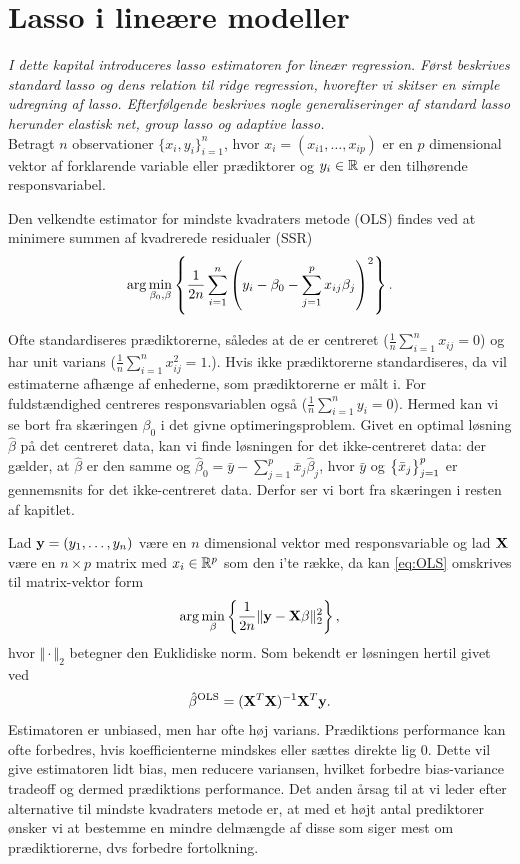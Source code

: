 \chapter{Lasso i lineære modeller}
\textit{I dette kapital introduceres lasso estimatoren for lineær regression. 
Først beskrives standard lasso og dens relation til ridge regression, hvorefter vi skitser en simple udregning af lasso.
Efterfølgende beskrives nogle generaliseringer af standard lasso herunder elastisk net, group lasso og adaptive lasso.} \\[4mm]
%
Betragt \(n\) observationer \(\{x_i, y_i\}_{i=1}^n \), hvor $x_i=(x_{i1}, \ldots, x_{ip})$ er en $p$ dimensional vektor af forklarende variable eller prædiktorer og $y_i \in \mathbb{R}$ er den tilhørende responsvariabel.

Den velkendte estimator for mindste kvadraters metode (OLS) findes ved at minimere summen af kvadrerede residualer (SSR)
\begin{align}
\arg \min_{\beta_0, \beta} \cbr{\frac{1}{2n} \sum_{i=1}^n \del{y_i - \beta_0 - \sum_{j=1}^p x_{ij} \beta_j}^2}. \label{eq:OLS}
\end{align}

Ofte standardiseres prædiktorerne, således at de er centreret (\(\frac{1}{n} \sum_{i=1}^n x_{ij} = 0\)) og har unit varians (\(\frac{1}{n} \sum_{i=1}^n x_{ij}^2=1\).).
Hvis ikke prædiktorerne standardiseres, da vil estimaterne afhænge af enhederne, som prædiktorerne er målt i.
For fuldstændighed centreres responsvariablen også (\(\frac{1}{n} \sum_{i=1}^n y_{i} = 0\)).
Hermed kan vi se bort fra skæringen $\beta_0$ i det givne optimeringsproblem.
Givet en optimal løsning \(\hat{\beta}\) på det centreret data, kan vi finde løsningen for det ikke-centreret data: der gælder, at \(\hat{\beta}\) er den samme og 
\(\hat{\beta}_0 = \bar{y} - \sum_{j=1}^p \bar{x}_j \hat{\beta}_j\), hvor \(\bar{y}\) og \(\cbr{\bar{x}_j}_{j=1}^p\) er gennemsnits for det ikke-centreret data.
Derfor ser vi bort fra skæringen i resten af kapitlet.

Lad \(\mathbf{y}=(y_1, \ldots, y_n)\) være en \(n\) dimensional vektor med responsvariable og lad \(\mathbf{X}\) være en $n \times p$ matrix med $x_i \in \mathbb{R}^p$ som den i'te række, da kan \eqref{eq:OLS} omskrives til matrix-vektor form
\begin{align*}
\arg \min_{ \beta} \cbr{\frac{1}{2n} \Vert \y - \X \beta \Vert_2^2},
\end{align*}
hvor \(\Vert \cdot \Vert_2\) betegner den Euklidiske norm.
Som bekendt er løsningen hertil givet ved
\begin{align*}
\hat{\beta}^{\text{OLS}} = (\mathbf{X}^T \mathbf{X})^{-1} \mathbf{X}^T \mathbf{y}.
\end{align*}
Estimatoren er unbiased, men har ofte høj varians. 
Prædiktions performance kan ofte forbedres, hvis koefficienterne mindskes eller sættes direkte lig 0.
Dette vil give estimatoren lidt bias, men reducere variansen, hvilket forbedre bias-variance tradeoff og dermed  prædiktions performance.
Det anden årsag til at vi leder efter alternative til mindste kvadraters metode er, at med et højt antal prediktorer ønsker vi at bestemme en mindre delmængde af disse som siger mest om prædiktiorerne, dvs forbedre fortolkning.\\[4mm]

